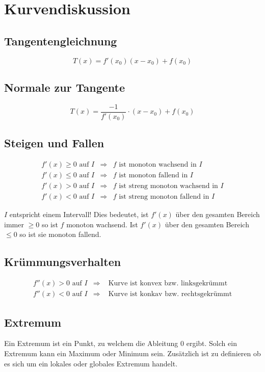 \section{Kurvendiskussion}

\subsection{Tangentengleichnung}
\label{subsec:tangentengleichung}
\[ \boxed{T(x) = f'(x_0)(x - x_0) + f(x_0)} \]

\subsection{Normale zur Tangente}
\[ \boxed{ T(x) = \frac{-1}{f'(x_0)} \cdot (x-x_0) + f(x_0) } \]

\subsection{Steigen und Fallen}

\[ \boxed{ \begin{array}{lll}
f'(x) \geq 0 \text{ auf } I & \Rightarrow  & f \text{ ist monoton wachsend in $I$} \\
f'(x) \leq 0 \text{ auf } I & \Rightarrow  & f \text{ ist monoton fallend in $I$} \\
f'(x) > 0 \text{ auf } I & \Rightarrow  & f \text{ ist streng monoton wachsend in $I$} \\
f'(x) < 0 \text{ auf } I & \Rightarrow  & f \text{ ist streng monoton fallend in $I$}
\end{array} } \]

\noindent
$I$ entspricht einem Intervall! Dies bedeutet, ist $f'(x)$ über den gesamten Bereich immer $\geq 0$ so ist $f$ monoton wachsend.
Ist $f'(x)$ über den gesamten Bereich $\leq 0$ so ist sie monoton fallend.

\subsection{Krümmungsverhalten}

\[ \boxed{ \begin{matrix}
f''(x) > 0 \text{ auf } I & \Rightarrow  & \text{ Kurve ist konvex bzw. linksgekrümmt} \\
f''(x) < 0 \text{ auf } I & \Rightarrow  & \text{ Kurve ist konkav bzw. rechtsgekrümmt}
\end{matrix} } \]

\subsection{Extremum}
Ein Extremum ist ein Punkt, zu welchem die Ableitung $0$ ergibt.
Solch ein Extremum kann ein Maximum oder Minimum sein.
Zusätzlich ist zu definieren ob es sich um ein lokales oder globales Extremum handelt.

